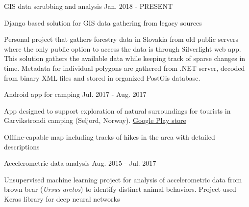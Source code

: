 
\begin{cventries}
  \cventry
    {} %
    {GIS data scrubbing and analysis} %
    {} %
    {Jan. 2018 - PRESENT} %
    {
      \begin{cvitems} %
        \item {Django based solution for GIS data gathering from legacy sources}
		\item {Personal project that gathers forestry data in Slovakia from old public servers where the only public option to access the data is through \mbox{Silverlight} web app. This solution gathers the available data while keeping track of sparse changes in time. Metadata for individual polygons are gathered from .NET server, decoded from binary XML files and stored in organized \mbox{PostGis} database.}
      \end{cvitems}
    }
    
  \cventry
    {} %
    {Android app for camping} %
    {} %
    {Jul. 2017 - Aug. 2017} %
    {
      \begin{cvitems} %
      	\item {App designed to support exploration of natural surroundings for tourists in Garvikstrondi camping (Seljord, Norway). \underline{\href{https://play.google.com/store/apps/details?id=sk.malobysa.www.garvikstronditur&hl=en}{Google Play store}}}
      	\item {Offline-capable map including tracks of hikes in the area with detailed descriptions}
      \end{cvitems}
    }
    
  \cventry
    {} %
    {Accelerometric data analysis} %
    {} %
    {Aug. 2015 - Jul. 2017} %
    {
      \begin{cvitems} %
      	\item {Unsupervised machine learning project for analysis of accelerometric data from brown bear (\textit{Ursus arctos}) to identify distinct animal behaviors. Project used Keras library for deep neural networks}
      \end{cvitems}
    }
\end{cventries}
